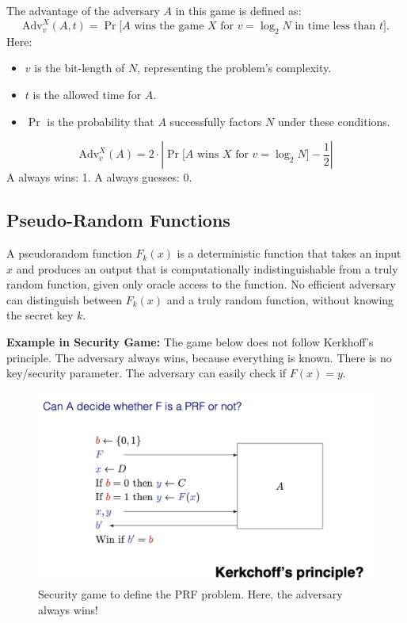 The advantage of the adversary \(A\) in this game is defined as:
\[
\text{Adv}_v^X(A, t) = \Pr\big[A \text{ wins the game } X \text{ for } v = \log_2 N \text{ in time less than } t\big].
\]
Here:
\begin{itemize}
    \item \(v\) is the bit-length of \(N\), representing the problem's complexity.
    \item \(t\) is the allowed time for \(A\).
    \item \(\Pr\) is the probability that \(A\) successfully factors \(N\) under these conditions.
\end{itemize}

\[
\text{Adv}_v^X(A) = 2 \cdot \left| \Pr\big[ A \text{ wins } X \text{ for } v = \log_2 N \big] - \frac{1}{2} \right|
\]
A always wins: 1. A always guesses: 0.

\subsection{Pseudo-Random Functions}
\begin{defn}
A pseudorandom function $F_k(x)$ is a deterministic function that takes an input $x$ and produces an output that is computationally indistinguishable from a truly random function, given only oracle access to the function. No efficient adversary can distinguish between $F_k(x)$ and a truly random function, without knowing the secret key $k$. 
\end{defn}

\textbf{Example in Security Game:}
The game below does not follow Kerkhoff's principle. The adversary always wins, because everything is known. There is no key/security parameter. The adversary can easily check if $F(x) = y$.
\begin{figure}[h!]
    \centering
    \includegraphics[scale=0.5]{img/PRFbad.png}
    \caption{Security game to define the PRF problem. Here, the adversary always wins!}
\end{figure}

